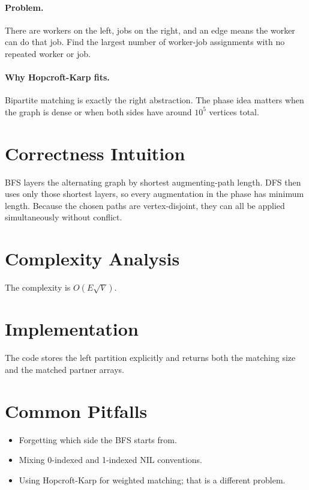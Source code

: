 \paragraph{Problem.}
There are workers on the left, jobs on the right, and an edge means the worker can do that job. Find the largest number
of worker-job assignments with no repeated worker or job.

\paragraph{Why Hopcroft-Karp fits.}
Bipartite matching is exactly the right abstraction. The phase idea matters when the graph is dense or when both sides
have around \(10^5\) vertices total.

\section*{Correctness Intuition}

BFS layers the alternating graph by shortest augmenting-path length. DFS then uses only those shortest layers, so every
augmentation in the phase has minimum length. Because the chosen paths are vertex-disjoint, they can all be applied
simultaneously without conflict.

\section*{Complexity Analysis}

The complexity is \(O(E\sqrt{V})\).

\section*{Implementation}

The code stores the left partition explicitly and returns both the matching size and the matched partner arrays.

\section*{Common Pitfalls}

\begin{itemize}
  \item Forgetting which side the BFS starts from.
  \item Mixing 0-indexed and 1-indexed NIL conventions.
  \item Using Hopcroft-Karp for weighted matching; that is a different problem.
\end{itemize}

